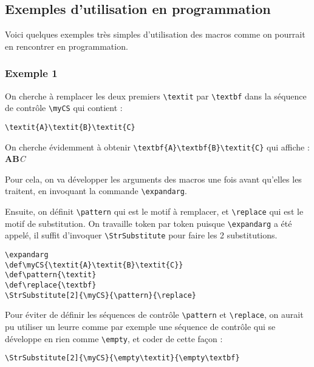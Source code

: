\documentclass[a4paper,10pt,french]{article}
\newcommand\guill[1]{\og{}#1\fg{}}
\newcommand\styleexercice{\footnotesize}
\newcommand\verbinline{\lstinline[basicstyle=\normalsize\ttfamily]}
\begin{document}
\subsection{Exemples d'utilisation en programmation}
\label{exemples}
Voici quelques exemples très simples d'utilisation des macros comme on pourrait en rencontrer en programmation.

\subsubsection{Exemple 1}
On cherche à remplacer les deux premiers \verb|\textit| par \verb|\textbf| dans la séquence de contrôle \verb|\myCS| qui contient :\par\nobreak\smallskip
\hfill\verb|\textit{A}\textit{B}\textit{C}|\hfill{}
\medskip

On cherche évidemment à obtenir \verb|\textbf{A}\textbf{B}\textit{C}| qui affiche : \textbf{A}\textbf{B}\textit{C}\medskip

Pour cela, on va développer les arguments des macros une fois avant qu'elles les traitent, en invoquant la commande \verbinline|\expandarg|.

Ensuite, on définit \verb|\pattern| qui est le motif à remplacer, et \verb|\replace| qui est le motif de substitution. On travaille token par token puisque \verbinline|\expandarg| a été appelé, il suffit d'invoquer \verbinline|\StrSubstitute| pour faire les 2 substitutions.\medskip

\begin{minipage}[c]{0.65\linewidth}
\begin{lstlisting}
\expandarg
\def\myCS{\textit{A}\textit{B}\textit{C}}
\def\pattern{\textit}
\def\replace{\textbf}
\StrSubstitute[2]{\myCS}{\pattern}{\replace}
\end{lstlisting}%
\end{minipage}\hfill
\begin{minipage}[c]{0.35\linewidth}
	\styleexercice
	\expandarg
	\def\myCS{\textit{A}\textit{B}\textit{C}}
	\def\pattern{\textit}
	\def\replace{\textbf}
	\StrSubstitute[2]{\myCS}{\pattern}{\replace}
\end{minipage}%
\medskip

Pour éviter de définir les séquences de contrôle \verb|\pattern| et \verb|\replace|, on aurait pu utiliser un leurre comme par exemple une séquence de contrôle qui se développe en \guill{rien} comme \verb|\empty|, et coder de cette façon :\par\smallskip
\hfil\verbinline|\StrSubstitute[2]{\myCS}{\empty\textit}{\empty\textbf}|\hfil{}\medskip
\end{document}
